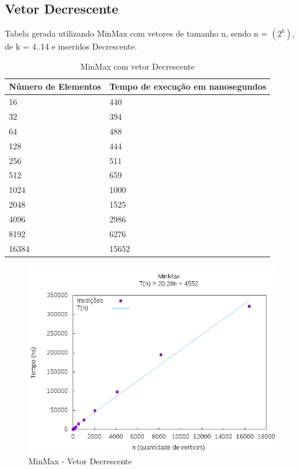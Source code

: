 \documentclass[12pt,a4paper,twoside]{report}
\begin{document}
\subsection{Vetor Decrescente}
Tabela gerada utilizando MinMax com vetores de tamanho n, sendo n = $(2^k)$, de k = 4..14 e inseridos Decrescente.
\begin{table}[H]
\centering
\caption{MinMax com vetor Decrescente}
\label{my-label}
\begin{tabular}{|l|l|}
\hline
\multicolumn{1}{|c|}{\textbf{Número de Elementos}} & \multicolumn{1}{c|}{\textbf{Tempo de execução em nanosegundos}} \\ \hline
16 & 440 \\ \hline
32 & 394 \\ \hline
64 & 488 \\ \hline
128 & 444 \\ \hline
256 & 511 \\ \hline
512 & 659 \\ \hline
1024 & 1000 \\ \hline
2048 & 1525 \\ \hline
4096 & 2986 \\ \hline
8192 & 6276 \\ \hline
16384 & 15652 \\ \hline
\end{tabular}
\end{table}

\begin{figure}[H]
    \centering
    \includegraphics[width=0.7\linewidth]{graficos/Min Max/Decrescente/MinMax.png}
  \caption{MinMax - Vetor Decrescente}
\end{figure}
\end{document}
